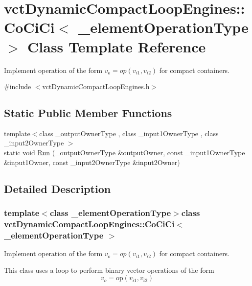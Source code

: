 \hypertarget{classvct_dynamic_compact_loop_engines_1_1_co_ci_ci}{\section{vct\-Dynamic\-Compact\-Loop\-Engines\-:\-:Co\-Ci\-Ci$<$ \-\_\-element\-Operation\-Type $>$ Class Template Reference}
\label{classvct_dynamic_compact_loop_engines_1_1_co_ci_ci}
}


Implement operation of the form $v_o = op(v_{i1}, v_{i2})$ for compact containers.  




{\ttfamily \#include $<$vct\-Dynamic\-Compact\-Loop\-Engines.\-h$>$}

\subsection*{Static Public Member Functions}
\begin{DoxyCompactItemize}
\item 
{\footnotesize template$<$class \-\_\-output\-Owner\-Type , class \-\_\-input1\-Owner\-Type , class \-\_\-input2\-Owner\-Type $>$ }\\static void \hyperlink{classvct_dynamic_compact_loop_engines_1_1_co_ci_ci_a929d4840f5b71152518d72eecf03b5db}{Run} (\-\_\-output\-Owner\-Type \&output\-Owner, const \-\_\-input1\-Owner\-Type \&input1\-Owner, const \-\_\-input2\-Owner\-Type \&input2\-Owner)
\end{DoxyCompactItemize}


\subsection{Detailed Description}
\subsubsection*{template$<$class \-\_\-element\-Operation\-Type$>$class vct\-Dynamic\-Compact\-Loop\-Engines\-::\-Co\-Ci\-Ci$<$ \-\_\-element\-Operation\-Type $>$}

Implement operation of the form $v_o = op(v_{i1}, v_{i2})$ for compact containers. 

This class uses a loop to perform binary vector operations of the form \[ v_o = \mathrm{op}(v_{i1}, v_{i2}) \]


